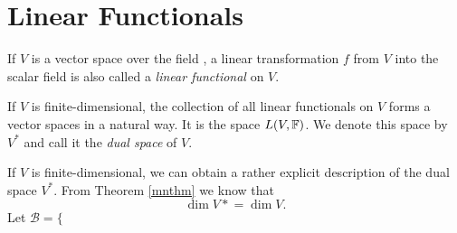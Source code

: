 \documentclass{mynotes}
\begin{document}
\section{Linear Functionals}
\begin{definition}
If $V$ is a vector space over the field \F, a linear transformation $f$ from $V$ into the scalar field \F is also called a \emph{linear functional} on $V$.
\end{definition}
\begin{definition}
If $V$ is finite-dimensional, the collection of all linear functionals on $V$ forms a vector spaces in a natural way. It is the space $L(V,\mathbb{F})$. We denote this space by $V^*$ and call it the \emph{dual space} of $V$.
\end{definition}
If $V$ is finite-dimensional, we can obtain a rather explicit description of the dual space $V^*$. From Theorem \ref{mnthm} we know that 
$$\dim{V*} = \dim{V}.$$
Let $\mathcal{B}=\{$
\end{document}
